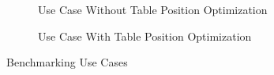 \begin{figure}[!htbp] %
	\centering
	\begin{subfigure}[b]{0.4\textwidth}
		\caption{Use Case Without Table Position Optimization}  
		\label{bm:uc1}
	\end{subfigure}
	\begin{subfigure}[b]{0.4\textwidth}
		\caption{Use Case With Table Position Optimization}  
		\label{bm:uc2}
	\end{subfigure}	
	\caption{Benchmarking Use Cases}
	\label{bm:uc}
\end{figure}
\clearpage
